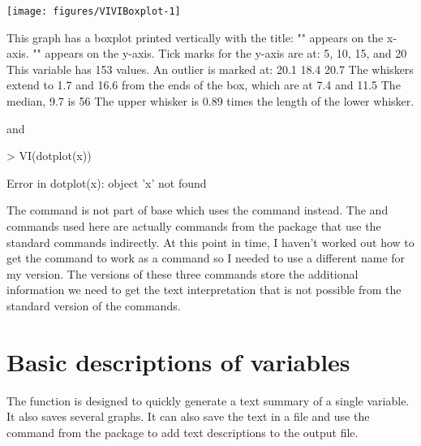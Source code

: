 \begin{Schunk}

\texttt{[image: figures/VIVIBoxplot-1]} \begin{Soutput}
This graph has a boxplot printed vertically
with the title: 
"" appears on the x-axis.
"" appears on the y-axis.
Tick marks for the y-axis are at: 5, 10, 15, and 20 
This variable  has 153 values.
An outlier is marked at: 20.1 18.4 20.7 
The whiskers extend to 1.7 and 16.6 from the ends of the box, 
which are at 7.4 and 11.5 
The median, 9.7 is 56 % from the lower end of the box to the upper end.
The upper whisker is 0.89 times the length of the lower whisker.
\end{Soutput}
\end{Schunk}

 and 

\begin{Schunk}
\begin{Sinput}
> VI(dotplot(x)) 
\end{Sinput}
\begin{Soutput}
Error in dotplot(x): object 'x' not found
\end{Soutput}
\end{Schunk}

 
The  command is not part of base \R{} which uses the  command instead. The  and  commands used here are actually commands from the  package that use the standard commands indirectly. At this point in time, I haven't worked out how to get the  command to work as a  command so I needed to use a different name for my version. The  versions of these three commands store the additional information we need to get the text interpretation that is not possible from the standard version of the commands. 
 
 
\section{Basic descriptions of variables} 
 
The  function is designed to quickly generate a text summary of a single variable. It also saves several graphs. It can also save the text in a file and use the  command from the  package to add text descriptions to the output file. 
 
